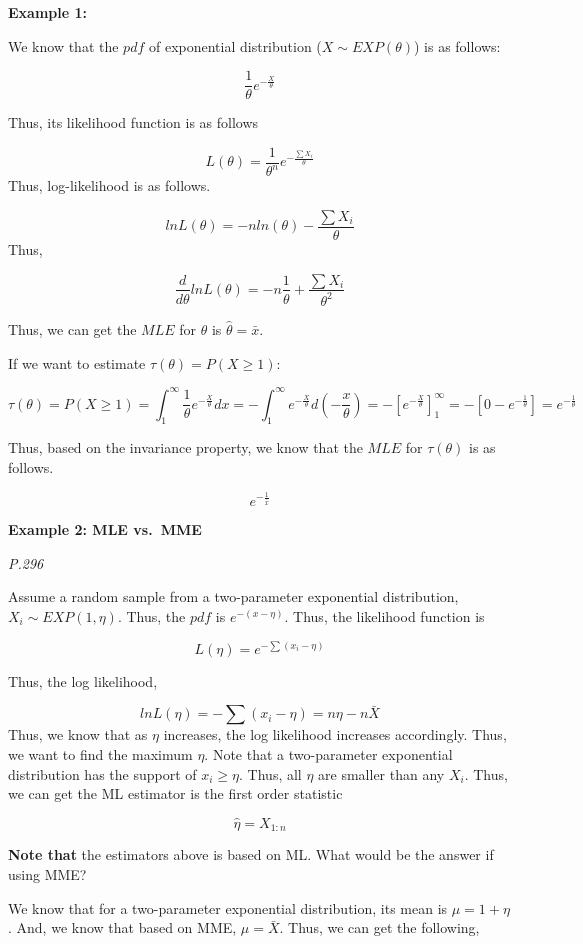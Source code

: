 \documentclass[]{book}
\begin{document}
\textbf{Example 1:}

We know that the \(pdf\) of exponential distribution (\(X \sim EXP (\theta)\)) is as follows:

\[\frac{1}{\theta} e^{-\frac{X}{\theta}}\]

Thus, its likelihood function is as follows

\[L(\theta)=\frac{1}{\theta^n}e^{-\frac{\sum X_i}{\theta}}\]
Thus, log-likelihood is as follows.

\[lnL(\theta)=-n ln(\theta)-\frac{\sum X_i}{\theta}\]
Thus,

\[\frac{d}{d\theta} lnL(\theta)=-n \frac{1}{\theta}+\frac{\sum X_i}{\theta^2}\]

Thus, we can get the \(MLE\) for \(\theta\) is \(\hat{\theta}=\bar{x}\).

If we want to estimate \(\tau(\theta)=P(X \geq 1)\):

\[\tau(\theta)=P(X\geq 1)=\int_1^{\infty} \frac{1}{\theta} e^{-\frac{X}{\theta}} dx=-\int_1^{\infty}  e^{-\frac{X}{\theta}} d(-\frac{x}{\theta})=-[e^{-\frac{X}{\theta}}]_1^{\infty}=-[0-e^{-\frac{1}{\theta}}]=e^{-\frac{1}{\theta}}\]

Thus, based on the invariance property, we know that the \(MLE\) for \(\tau(\theta)\) is as follows.

\[e^{-\frac{1}{\bar{x}}}\]

\textbf{Example 2: MLE vs.~MME}

\emph{P.296}

Assume a random sample from a two-parameter exponential distribution, \(X_i \sim EXP(1,\eta)\). Thus, the \(pdf\) is \(e^{-(x-\eta)}\). Thus, the likelihood function is

\[L(\eta)=e^{-\sum(x_i-\eta)}\]

Thus, the log likelihood,

\[lnL(\eta)=-\sum(x_i-\eta)=n\eta-n\bar{X}\]
Thus, we know that as \(\eta\) increases, the log likelihood increases accordingly. Thus, we want to find the maximum \(\eta\). Note that a two-parameter exponential distribution has the support of \(x_i \geq \eta\). Thus, all \(\eta\) are smaller than any \(X_i\). Thus, we can get the ML estimator is the first order statistic

\[\hat{\eta}=X_{1:n}\]

\textbf{Note that} the estimators above is based on ML. What would be the answer if using MME?

We know that for a two-parameter exponential distribution, its mean is \(\mu=1+\eta\). And, we know that based on MME, \(\mu=\bar{X}\). Thus, we can get the following,
\end{document}
